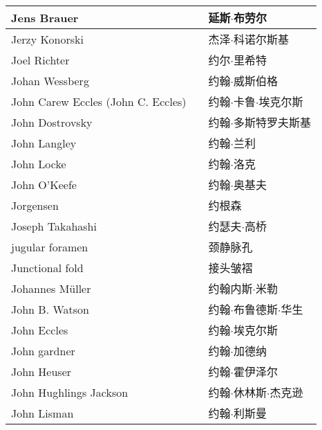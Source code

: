 \begin{longtable}{lll}
	\midrule
	Jens Brauer   && 延斯$\cdot$布劳尔  \\
	
	\midrule
	Jerzy Konorski   && 杰泽$\cdot$科诺尔斯基  \\
	
	\midrule
	Joel Richter   && 约尔$\cdot$里希特  \\
	
	\midrule
	Johan Wessberg   && 约翰$\cdot$威斯伯格  \\
	
	\midrule
	John Carew Eccles (John C. Eccles)   && 约翰$\cdot$卡鲁$\cdot$埃克尔斯  \\
	
	\midrule
	John Dostrovsky   && 约翰$\cdot$多斯特罗夫斯基  \\
	
	\midrule
	John Langley   && 约翰$\cdot$兰利  \\
	
	\midrule
	John Locke   && 约翰$\cdot$洛克  \\
	
	\midrule
	John O’Keefe   && 约翰$\cdot$奥基夫  \\
	
	\midrule
	Jorgensen   && 约根森  \\
	
	\midrule
	Joseph Takahashi   && 约瑟夫$\cdot$高桥  \\
	
	\midrule
	jugular foramen   && 颈静脉孔  \\
	
	\midrule
	Junctional fold   && 接头皱褶  \\
	
	\midrule
	Johannes Müller   && 约翰内斯$\cdot$米勒  \\
	
	\midrule
	John B. Watson   && 约翰$\cdot$布鲁德斯$\cdot$华生  \\
	
	\midrule
	John Eccles   && 约翰$\cdot$埃克尔斯  \\
	
	\midrule
	John gardner   && 约翰$\cdot$加德纳  \\
	
	\midrule
	John Heuser   && 约翰$\cdot$霍伊泽尔  \\
	
	\midrule
	John Hughlings Jackson   && 约翰$\cdot$休林斯$\cdot$杰克逊  \\
	
	\midrule
	John Lisman   && 约翰$\cdot$利斯曼  \\
	

\end{longtable}
